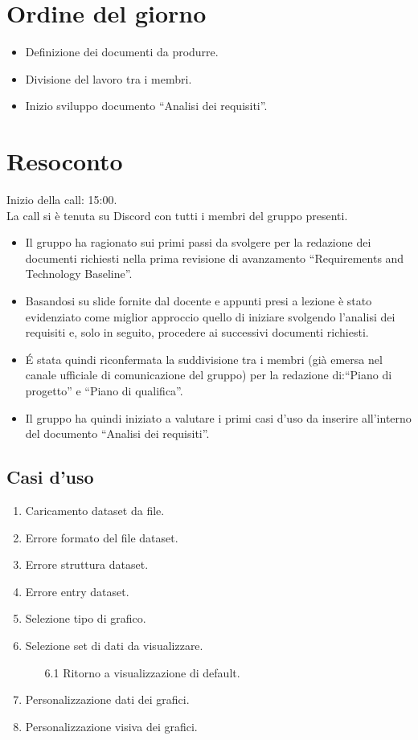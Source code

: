 \section{Ordine del giorno}

\begin{itemize}
	\item Definizione dei documenti da produrre.
	\item Divisione del lavoro tra i membri.
	\item Inizio sviluppo documento ``Analisi dei requisiti''.
\end{itemize}

\section{Resoconto}

\noindent 
Inizio della call: 15:00. \\
\noindent La call si è tenuta su Discord con tutti i membri del gruppo presenti.
\begin{itemize}
	\item Il gruppo ha ragionato sui primi passi da svolgere per la redazione dei documenti richiesti nella prima revisione di avanzamento ``Requirements and Technology Baseline''.
	\item Basandosi su slide fornite dal docente e appunti presi a lezione è stato evidenziato come miglior approccio quello di iniziare svolgendo l'analisi dei requisiti e, solo in seguito, procedere ai successivi documenti richiesti.
	\item \' E stata quindi riconfermata la suddivisione tra i membri (già emersa nel canale ufficiale di comunicazione del gruppo) per la redazione di:``Piano di progetto'' e ``Piano di qualifica''.
	\item Il gruppo ha quindi iniziato a valutare i primi casi d'uso da inserire all'interno del documento ``Analisi dei requisiti''.
\end{itemize}

\subsection{Casi d'uso}
\begin{enumerate}
	\item Caricamento dataset da file.
	\item Errore formato del file dataset.
	\item Errore struttura dataset.
	\item Errore entry dataset.
	\item Selezione tipo di grafico.
	\item Selezione set di dati da visualizzare.
	\begin{enumerate}
		\item[6.1] Ritorno a visualizzazione di default.
	\end{enumerate}
	\item Personalizzazione dati dei grafici.
	\item Personalizzazione visiva dei grafici.
\end{enumerate} 

